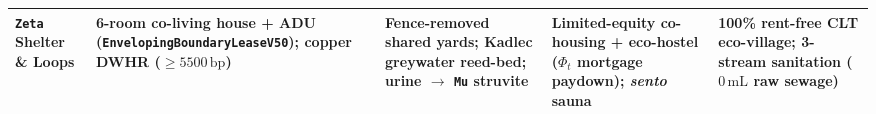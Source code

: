 \begin{table}[htbp]
{\begin{tabular}{@{}p{2.1cm}p{2.6cm}p{2.8cm}p{2.8cm}p{2.9cm}@{}}
\addlinespace[3pt]
\textbf{\texttt{Zeta} Shelter \& Loops} & 6-room co-living house + ADU (\texttt{EnvelopingBoundaryLeaseV50}); copper DWHR ($\ge 5500\,\mathrm{bp}$) & Fence-removed shared yards; Kadlec greywater reed-bed; urine $\to$ \texttt{Mu} struvite & Limited-equity co-housing + eco-hostel ($\Phi_t$ mortgage paydown); \textit{sento} sauna & 100\% rent-free CLT eco-village; 3-stream sanitation ($0\,\mathrm{mL}$ raw sewage) \\
\bottomrule
\end{tabular}%
}
\end{table}
